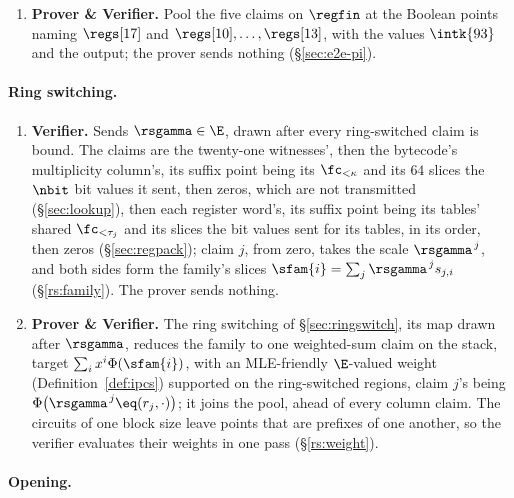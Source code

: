 \begin{enumerate}
\item \textbf{Prover \& Verifier.} Pool the five claims on $\regfin$ at the Boolean points naming $\regs[17]$ and $\regs[10],\dots,\regs[13]$, with the values $\intk{93}$ and the output; the prover sends nothing (\S\ref{sec:e2e-pi}).
\end{enumerate}

\paragraph{Ring switching.}

\begin{enumerate}
\item \textbf{Verifier.} Sends $\rsgamma\in\E$, drawn after every ring-switched claim is bound. The claims are the twenty-one witnesses', then the bytecode's multiplicity column's, its suffix point being its $\fc_{<\kappa}$ and its $64$ slices the $\nbit$ bit values it sent, then zeros, which are not transmitted (\S\ref{sec:lookup}), then each register word's, its suffix point being its tables' shared $\fc_{<\tau_j}$ and its slices the bit values sent for its tables, in its order, then zeros (\S\ref{sec:regpack}); claim $j$, from zero, takes the scale $\rsgamma^{\,j}$, and both sides form the family's slices $\sfam{i}=\sum_j\rsgamma^{\,j}s_{j,i}$ (\S\ref{rs:family}). The prover sends nothing.
\item \textbf{Prover \& Verifier.} The ring switching of \S\ref{sec:ringswitch}, its map drawn after $\rsgamma$, reduces the family to one weighted-sum claim on the stack, target $\sum_ix^i\Phi(\sfam{i})$, with an MLE-friendly $\E$-valued weight (Definition~\ref{def:ipcs}) supported on the ring-switched regions, claim $j$'s being $\Phi\bigl(\rsgamma^{\,j}\eq(r_j,\cdot)\bigr)$; it joins the pool, ahead of every column claim. The circuits of one block size leave points that are prefixes of one another, so the verifier evaluates their weights in one pass (\S\ref{rs:weight}).
\end{enumerate}

\paragraph{Opening.}

